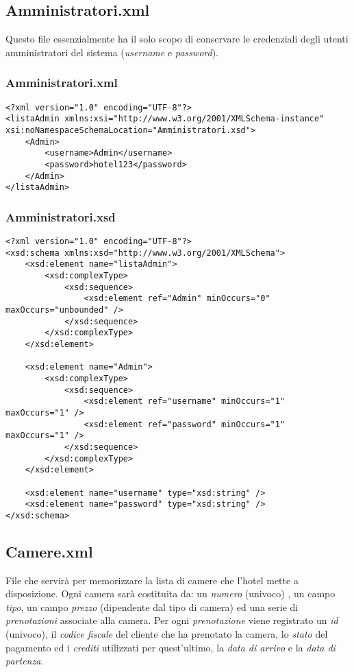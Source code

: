 \documentclass [a4paper, 12pt]{book}
\begin{document}
\subsection{Amministratori.xml}
Questo file essenzialmente ha il solo scopo di conservare le credenziali degli utenti amministratori del sistema (\textit{username} e \textit{password}).
\subsubsection{Amministratori.xml}
\begin{lstlisting}[style=XML]
<?xml version="1.0" encoding="UTF-8"?>
<listaAdmin xmlns:xsi="http://www.w3.org/2001/XMLSchema-instance" xsi:noNamespaceSchemaLocation="Amministratori.xsd">
    <Admin>
        <username>Admin</username>
        <password>hotel123</password>
    </Admin>
</listaAdmin> 
\end{lstlisting}
\subsubsection{Amministratori.xsd}
\begin{lstlisting}[style=XML]
<?xml version="1.0" encoding="UTF-8"?>
<xsd:schema xmlns:xsd="http://www.w3.org/2001/XMLSchema">
    <xsd:element name="listaAdmin">
        <xsd:complexType>
            <xsd:sequence>
                <xsd:element ref="Admin" minOccurs="0" maxOccurs="unbounded" />
            </xsd:sequence>
        </xsd:complexType>
    </xsd:element>

    <xsd:element name="Admin">
        <xsd:complexType>
            <xsd:sequence>
                <xsd:element ref="username" minOccurs="1" maxOccurs="1" />
                <xsd:element ref="password" minOccurs="1" maxOccurs="1" />
            </xsd:sequence>
        </xsd:complexType>
    </xsd:element>

    <xsd:element name="username" type="xsd:string" />
    <xsd:element name="password" type="xsd:string" />
</xsd:schema>
\end{lstlisting}
\subsection{Camere.xml}
File che servirà per memorizzare la lista di camere che l'hotel mette a disposizione. Ogni camera sarà costituita da: un \textit{numero} (univoco) , un campo \textit{tipo}, un campo \textit{prezzo} (dipendente dal tipo di camera) ed una serie di \textit{prenotazioni} associate alla camera. Per ogni \textit{prenotazione} viene registrato un \textit{id} (univoco), il \textit{codice fiscale} del cliente che ha prenotato la camera, lo \textit{stato} del pagamento ed i \textit{crediti} utilizzati per quest'ultimo, la \textit{data di arrivo} e la \textit{data di partenza}.
\end{document}
